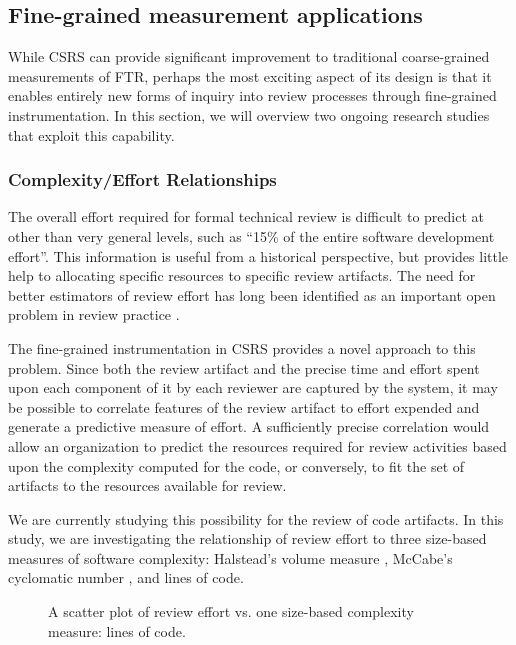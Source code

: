 \subsection{Fine-grained measurement applications}

While CSRS can provide significant improvement to traditional
coarse-grained measurements of FTR, perhaps the most exciting aspect of its
design is that it enables entirely new forms of inquiry into review
processes through fine-grained instrumentation. In this section, we will
overview two ongoing research studies that exploit this capability.


\subsubsection{Complexity/Effort Relationships}

The overall effort required for formal technical review is difficult to
predict at other than very general levels, such as ``15\% of the entire
software development effort''.  This information is useful from a
historical perspective, but provides little help to allocating specific
resources to specific review artifacts.  The need for better estimators of
review effort has long been identified as an important open problem in
review practice \cite{Fagan86}.

The fine-grained instrumentation in CSRS provides a novel approach to this
problem.  Since both the review artifact and the precise time and effort
spent upon each component of it by each reviewer are captured by the
system, it may be possible to correlate features of the review artifact to
effort expended and generate a predictive measure of effort.  A
sufficiently precise correlation would allow an organization to predict the
resources required for review activities based upon the complexity computed
for the code, or conversely, to fit the set of artifacts to the resources
available for review.

We are currently studying this possibility for the review of code 
artifacts.  In this study, we are investigating the relationship of 
review effort to three size-based measures of software complexity: Halstead's 
volume measure \cite{Halstead77}, McCabe's cyclomatic
number \cite{McCabe76}, and lines of code.  

\begin{figure}
 {\centerline{}}
\caption{A scatter plot of review effort vs. one size-based complexity
measure: lines of code.}
\label{fig:scatter}
\end{figure}

